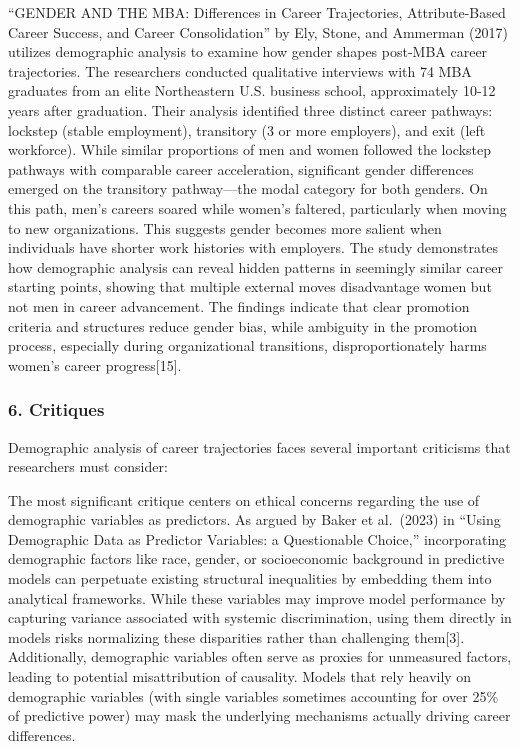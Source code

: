 \documentclass[./main.tex]{subfiles}
\begin{document}
``GENDER AND THE MBA: Differences in Career Trajectories,
Attribute-Based Career Success, and Career Consolidation'' by Ely,
Stone, and Ammerman (2017) utilizes demographic analysis to examine how
gender shapes post-MBA career trajectories. The researchers conducted
qualitative interviews with 74 MBA graduates from an elite Northeastern
U.S. business school, approximately 10-12 years after graduation. Their
analysis identified three distinct career pathways: lockstep (stable
employment), transitory (3 or more employers), and exit (left
workforce). While similar proportions of men and women followed the
lockstep pathways with comparable career acceleration, significant
gender differences emerged on the transitory pathway---the modal
category for both genders. On this path, men's careers soared while
women's faltered, particularly when moving to new organizations. This
suggests gender becomes more salient when individuals have shorter work
histories with employers. The study demonstrates how demographic
analysis can reveal hidden patterns in seemingly similar career starting
points, showing that multiple external moves disadvantage women but not
men in career advancement. The findings indicate that clear promotion
criteria and structures reduce gender bias, while ambiguity in the
promotion process, especially during organizational transitions,
disproportionately harms women's career progress{[}15{]}.

\subsubsection{6. Critiques}\label{critiques}

Demographic analysis of career trajectories faces several important
criticisms that researchers must consider:

The most significant critique centers on ethical concerns regarding the
use of demographic variables as predictors. As argued by Baker et
al.~(2023) in ``Using Demographic Data as Predictor Variables: a
Questionable Choice,'' incorporating demographic factors like race,
gender, or socioeconomic background in predictive models can perpetuate
existing structural inequalities by embedding them into analytical
frameworks. While these variables may improve model performance by
capturing variance associated with systemic discrimination, using them
directly in models risks normalizing these disparities rather than
challenging them{[}3{]}. Additionally, demographic variables often serve
as proxies for unmeasured factors, leading to potential misattribution
of causality. Models that rely heavily on demographic variables (with
single variables sometimes accounting for over 25\% of predictive power)
may mask the underlying mechanisms actually driving career differences.
\end{document}
